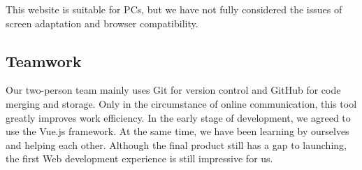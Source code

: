 \documentclass{article}
\begin{document}
This website is suitable for PCs, but we have not fully considered the issues
of screen adaptation and browser compatibility.
\subsection{Teamwork}
Our two-person team mainly uses Git for version control and 
GitHub for code merging and storage. Only in the circumstance 
of online communication, this tool greatly improves work 
efficiency. In the early stage of development, we agreed 
to use the Vue.js framework. At the same time, we have 
been learning by ourselves and helping each other. 
Although the final product still has a gap to launching, 
the first Web development experience is still impressive for us.
    
\end{document}
